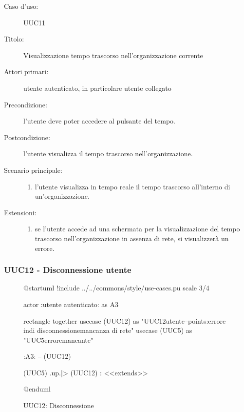 \documentclass[casi-duso]{subfiles}
\begin{document}
\begin{description}
  \item[Caso d’uso:] UUC11
  \item[Titolo:] Visualizzazione tempo trascorso nell'organizzazione corrente
  \item[Attori primari:] utente autenticato, in particolare utente collegato
  \item[Precondizione:] l'utente deve poter accedere al pulsante del tempo.
  \item[Postcondizione:] l'utente visualizza il tempo trascorso nell'organizzazione.
  \item[Scenario principale:]
        \begin{enumerate}
          \item l'utente visualizza in tempo reale il tempo trascorso all'interno di un'organizzazione.
        \end{enumerate}
  \item[Estensioni:]
        \begin{enumerate}
          \item se l'utente accede ad una schermata per la visualizzazione del tempo trascorso nell'organizzazione in assenza di rete, si visualizzerà un errore.
        \end{enumerate}
\end{description}

\subsubsection{UUC12 - Disconnessione utente}%
\label{subsub:UUC12utente}

\begin{figure}[h!] 
  \centering 
  \begin{plantuml}
  @startuml
  !include ../../commons/style/use-cases.pu
  scale 3/4

  actor :utente autenticato: as A3

  rectangle {
    together {
      usecase (UUC12) as "UUC12\nDisconnessione utente\n--\nExtension points:\nVisualizzazione errore in\ncaso di disconnessione\nin mancanza di rete"
      usecase (UUC5) as "UUC5\nVisualizzazione errore\nrete mancante"
    }
  }

  :A3: -- (UUC12)

  (UUC5) .up.|> (UUC12) : <<extends>>

  @enduml
  \end{plantuml} 
  \caption{UUC12: Disconnessione} 
  \label{fig:uuc12} 
\end{figure}
\end{document}
